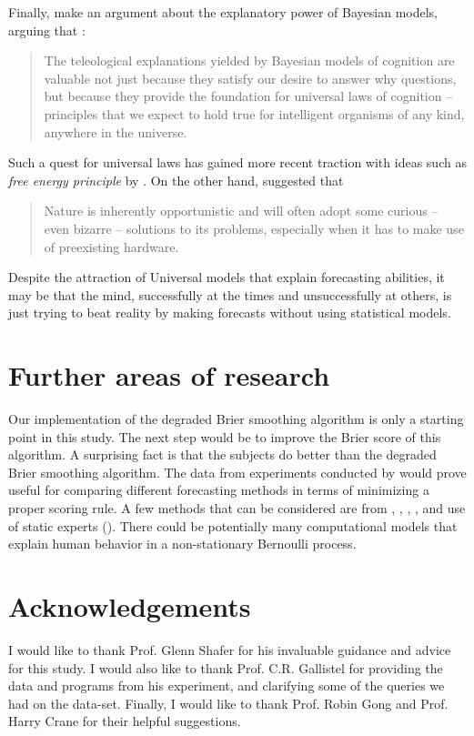 \documentclass{article}
\begin{document}
Finally, \cite{griffiths2012bayesians} make an argument about the explanatory power of Bayesian models, arguing that :
\begin{quote}
The teleological explanations yielded by Bayesian models of cognition are valuable not just because they satisfy our desire to answer why questions, but because they provide the foundation for universal laws of cognition -- principles that we expect to hold true for intelligent organisms of any kind, anywhere in the universe.
\end{quote}

Such a quest for universal laws has gained more recent traction with ideas such as \textit{free energy principle} by \cite{friston2006free}. On the other hand, \cite{ramachandran1990interactions} suggested that
\begin{quote}
Nature is inherently opportunistic and will often adopt some curious -- even bizarre -- solutions to its problems, especially when it has to make use of preexisting hardware.
\end{quote}

Despite the attraction of Universal models that explain forecasting abilities, it may be that the mind, successfully at the times and unsuccessfully at others, is just trying to beat reality by making forecasts without using statistical models.

\section{Further areas of research}
\label{further}
Our implementation of the degraded Brier smoothing algorithm is only a starting point in this study. The next step would be to improve the Brier score of this algorithm. A surprising fact is that the subjects do better than the degraded Brier smoothing algorithm. The data from experiments conducted by \cite{gallistel2014perception} would prove useful for comparing different forecasting methods in terms of minimizing a proper scoring rule. A few methods that can be considered are from \cite{defesive}, \cite{FREUND200373}, \cite{weissman2001universal}, \cite{vovk2005good}, \cite{rakhlin2015sequential} and use of static experts (\cite{cesa1997use}). There could be potentially many computational models that explain human behavior in a non-stationary Bernoulli process.

\section{Acknowledgements}
I would like to thank Prof. Glenn Shafer for his invaluable guidance and advice for this study. I would also like to thank Prof. C.R. Gallistel for providing the data and programs from his experiment, and clarifying some of the queries we had on the data-set. Finally, I would like to thank Prof. Robin Gong and Prof. Harry Crane for their helpful suggestions.
\end{document}
